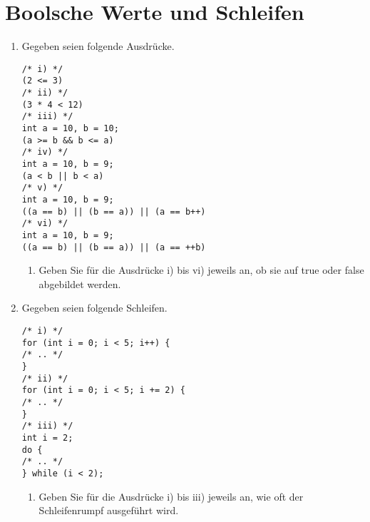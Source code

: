 \documentclass[ngerman]{tudscrreprt}
\begin{document}
%
\section*{Boolsche Werte und Schleifen}
\begin{enumerate}
	\item Gegeben seien folgende Ausdrücke.
	      \begin{lstlisting}[frame=single]
/* i) */
(2 <= 3)
/* ii) */
(3 * 4 < 12)
/* iii) */
int a = 10, b = 10;
(a >= b && b <= a)
/* iv) */
int a = 10, b = 9;
(a < b || b < a)
/* v) */
int a = 10, b = 9;
((a == b) || (b == a)) || (a == b++)
/* vi) */
int a = 10, b = 9;
((a == b) || (b == a)) || (a == ++b)
	\end{lstlisting}
	\begin{enumerate}
		\item Geben Sie für die Ausdrücke i) bis vi) jeweils an, ob sie auf true oder false abgebildet werden.
		      \begin{labeling}{iiii}
		      	\item [i] :
		      	\item [ii] :
		      	\item [iii] :
		      	\item [iv] : 
		      	\item [v] : 
		      	\item [vi] :
		      \end{labeling}
	\end{enumerate}
	\pagebreak
	\item Gegeben seien folgende Schleifen.
	      \begin{lstlisting}[frame=single]
/* i) */
for (int i = 0; i < 5; i++) {
/* .. */
}
/* ii) */
for (int i = 0; i < 5; i += 2) {
/* .. */
}
/* iii) */
int i = 2;
do {
/* .. */
} while (i < 2);
	\end{lstlisting}
	\begin{enumerate}
		\item Geben Sie für die Ausdrücke i) bis iii) jeweils an, wie oft der Schleifenrumpf ausgeführt wird.
		      \begin{labeling}{iiii}
		      	\item [i] :
		      	\item [ii] :
		      	\item [iii] :
		      \end{labeling}
	\end{enumerate}
\end{enumerate}
\pagebreak
\end{document}
